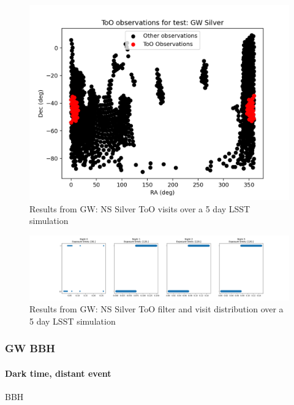 \begin{figure}[h!]
    \centering
    \includegraphics[width=0.85\linewidth]{figures/validationTests/SVRequired/GWSilverPosition.png}
    \caption{Results from GW: NS Silver ToO visits over a 5 day LSST simulation}
    \label{fig:GWSilverPositionResult}
\end{figure}

\begin{figure}[h!]
    \centering
    \includegraphics[width=\linewidth]{figures/validationTests/SVRequired/GWSilverFilterPlot.png}
    \caption{Results from GW: NS Silver ToO filter and visit distribution over a 5 day LSST simulation}
    \label{fig:GWSilverFilterResult}
\end{figure}

\clearpage

\subsubsection{GW BBH}

\paragraph{Dark time, distant event}

BBH


